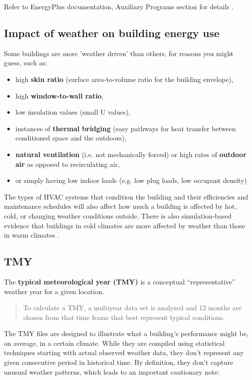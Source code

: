 \documentclass[10pt]{article}
\begin{document}
Refer to EnergyPlus documentation, Auxiliary Programs section for details \cite{EP9docs}.

\subsection{Impact of weather on building energy use}

Some buildings are more 'weather driven' than others, for reasons you might guess, such as: 
\begin{itemize}
    \setlength{\itemsep}{0pt}%
    \setlength{\parskip}{0pt}%
    \item high \textbf{skin ratio} (surface area-to-volume ratio for the building envelope),
    \item high \textbf{window-to-wall ratio},
    \item low insulation values (small U values),
    \item instances of \textbf{thermal bridging} (easy pathways for heat transfer between conditioned space and the outdoors),
    \item \textbf{natural ventilation} (i.e. not mechanically forced) or high rates of \textbf{outdoor air} as opposed to recirculating air,
    \item or simply having low indoor loads (e.g. low plug loads, low occupant density)
\end{itemize}

The types of HVAC systems that condition the building and their efficiencies and maintenance schedules will also affect how much a building is affected by hot, cold, or changing weather conditions outside. There is also simulation-based evidence that buildings in cold climates are more affected by weather than those in warm climates \cite{Hong2013-ti}.

\subsection{TMY}

The \textbf{typical meteorological year (TMY)} is a conceptual ``representative'' weather year for a given location. 

\begin{quote}
To calculate a TMY, a multiyear data set is analyzed and 12 months are chosen from that time frame that best represent typical conditions. \cite{tmy-nsrdb}
\end{quote}

The TMY files are designed to illustrate what a building's performance might be, on average, in a certain climate. While they are compiled using statistical techniques starting with actual observed weather data, they don't represent any given consecutive period in historical time. By definition, they don't capture unusual weather patterns, which leads to an important cautionary note:
\end{document}
